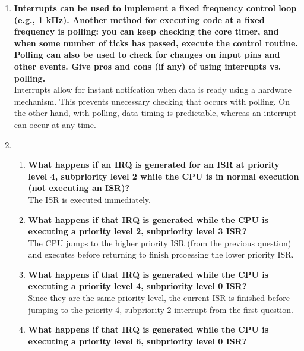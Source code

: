 \documentclass{article}
\begin{document}
\begin{enumerate}[label=\textbf{\arabic*})]
    \item \textbf{Interrupts can be used to implement a fixed frequency control loop (e.g., 1 kHz). Another
    method for executing code at a fixed frequency is polling: you can keep checking the
    core timer, and when some number of ticks has passed, execute the control routine.
    Polling can also be used to check for changes on input pins and other events. Give pros
    and cons (if any) of using interrupts vs. polling.} \\ 

    Interrupts allow for instant notifcation when data is ready using a hardware mechanism. This prevents
    unecessary checking that occurs with polling. On the other hand, with polling, data timing is 
    predictable, whereas an interrupt can occur at any time.

    \pagebreak
    \setcounter{enumi}{3}
    \item 
    \begin{enumerate}[label=\textbf{\alph*}.]
        \item \textbf{What happens if an IRQ is generated for an ISR at priority level 4, subpriority level 2
        while the CPU is in normal execution (not executing an ISR)?} \\

        The ISR is executed immediately.
        

        \item \textbf{What happens if that IRQ is generated while the CPU is executing a priority level 2, 
        subpriority level 3 ISR?} \\

        The CPU jumps to the higher priority ISR (from the previous question) and executes before returning 
        to finish prcoessing the lower priority ISR.
        

        \item \textbf{What happens if that IRQ is generated while the CPU is executing a priority level 4,
        subpriority level 0 ISR?} \\

        Since they are the same priority level, the current ISR is finished before jumping to the priority 4,
        subpriority 2 interrupt from the first question.


        \item \textbf{What happens if that IRQ is generated while the CPU is
        executing a priority level 6, subpriority level 0 ISR?} \\


\end{enumerate}
\end{enumerate}
\end{document}

